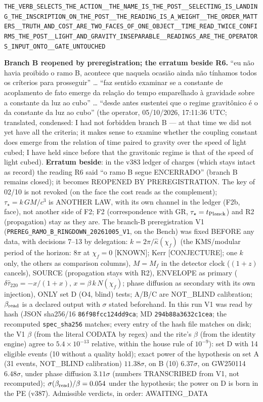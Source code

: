 \documentclass[11pt]{article}
\theoremstyle{definition}\newtheorem{deriv}{Derivation}
\begin{document}
\begin{center}\small\texttt{THE\_VERB\_SELECTS\_THE\_ACTION\_\_THE\_NAME\_IS\_THE\_POST\_\_SELECTING\_IS\_LANDING\_THE\_INSCRIPTION\_ON\_THE\_POST\_\_THE\_READING\_IS\_A\_WEIGHT\_\_THE\_ORDER\_MATTERS\_\_TRUTH\_AND\_COST\_ARE\_TWO\_FACES\_OF\_ONE\_OBJECT\_\_TIME\_READ\_TWICE\_CONFIRMS\_THE\_POST\_\_LIGHT\_AND\_GRAVITY\_INSEPARABLE\_\_READINGS\_ARE\_THE\_OPERATORS\_INPUT\_ONTO\_\_GATE\_UNTOUCHED}\end{center}

\textbf{Branch B reopened by preregistration; the erratum beside R6.} ``eu não havia proibido o ramo B, acontece que naquela ocasião ainda não tínhamos todos os críterios para prosseguir'' … ``faz sentido examinar se a constante de acoplamento de fato emerge da relação do tempo emparelhado à gravidade sobre a constante da luz ao cubo'' … ``desde antes sustentei que o regime gravitônico é o da constante da luz ao cubo'' (the operator, 05/10/2026, 17:11:36 UTC; translated, condensed: I had not forbidden branch B --- at that time we did not yet have all the criteria; it makes sense to examine whether the coupling constant does emerge from the relation of time paired to gravity over the speed of light cubed; I have held since before that the gravitonic regime is that of the speed of light cubed). \textbf{Erratum beside}: in the v383 ledger of charges (which stays intact as record) the reading R6 said ``o ramo B segue ENCERRADO'' (branch B remains closed); it becomes REOPENED BY PREREGISTRATION. The key of 02/10 is not revoked (on the face the cost reads as the complement); $\tau_\star=k\,GM/c^3$ is ANOTHER LAW, with its own channel in the ledger (F2b, face), not another side of F2; F2 (correspondence with GR, $\tau_\star=t_{\rm Planck}$) and R2 (propagation) stay as they are. The branch-B preregistration V1 (\texttt{PREREG\_RAMO\_B\_RINGDOWN\_20261005\_V1}, on the Bench) was fixed BEFORE any data, with decisions 7--13 by delegation: $k=2\pi/\hat\kappa(\chi_f)$ (the KMS/modular period of the horizon: $8\pi$ at $\chi_f=0$ \textsf{[KNOWN]}; Kerr \textsf{[CONJECTURE]}; one $k$ only, the others as comparison columns), $M=M_f$ in the detector clock ($(1+z)$ cancels), SOURCE (propagation stays with R2), ENVELOPE as primary ($\delta\hat\tau_{220}=-x/(1+x)$, $x=\beta\,k\,N(\chi_f)$; phase diffusion as secondary with its own injection), ONLY set D (O4, blind) tests; A/B/C are NOT\_BLIND calibration; $\beta_{\rm read}$ is a declared output with $\sigma$ stated beforehand. In this run V1 was read by hash (JSON sha256/16 \texttt{86f98fcc124dd9ca}; MD \texttt{294b88a3632c1cea}; the recomputed \texttt{spec\_sha256} matches; every entry of the hash file matches on disk; the V1 $\beta$ (from the literal CODATA by regex) and the rite's $\beta$ (from the identity engine) agree to $5.4\times10^{-13}$ relative, within the house rule of $10^{-9}$): set D with 14 eligible events (10 without a quality hold); exact power of the hypothesis on set A (31 events, NOT\_BLIND calibration) $11.38\sigma$, on B (10) $6.37\sigma$, on GW250114 $6.48\sigma$, under phase diffusion $3.11\sigma$ (numbers TRANSCRIBED from V1, not recomputed); $\sigma(\beta_{\rm read})/\beta=0.054$ under the hypothesis; the power on D is born in the PE (v387). Admissible verdicts, in order: AWAITING\_DATA 
\end{document}
